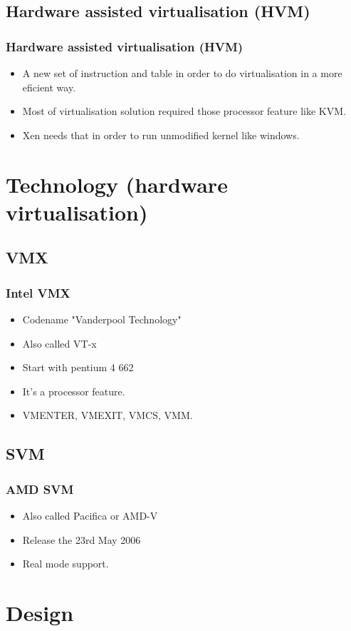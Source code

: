 \subsection{Hardware assisted virtualisation (HVM)}
\begin{frame}
\frametitle{Hardware assisted virtualisation (HVM)}
\begin{itemize}
\item A new set of instruction and table in order to do virtualisation
in a more eficient way.
\item Most of virtualisation solution required those processor feature
like KVM.
\item Xen needs that in order to run unmodified kernel like windows.
\end{itemize}
\end{frame}

\section{Technology (hardware virtualisation)}
\subsection{VMX}
\begin{frame}
\frametitle{Intel VMX}
\begin{itemize}
\item Codename "Vanderpool Technology"
\item Also called VT-x
\item Start with pentium 4 662
\item It's a processor feature.
\item VMENTER, VMEXIT, VMCS, VMM.
\end{itemize}
\end{frame}
\subsection{SVM}
\begin{frame}
\frametitle{AMD SVM}
\begin{itemize}
\item Also called Pacifica or AMD-V
\item Release the 23rd May 2006
\item Real mode support.
\end{itemize}
\end{frame}

\section{Design}

